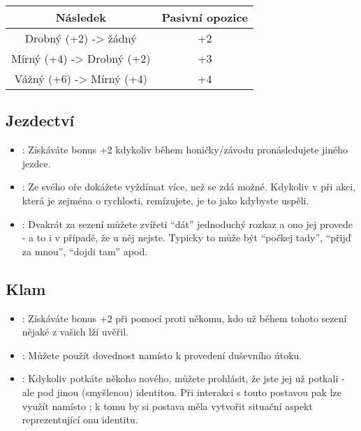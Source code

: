 \begin{table}[h]  
\centering
\begin{tabular}[h]{c|c}
Následek & Pasivní opozice \\ \hline
Drobný (+2) -> žádný & +2 \\
Mírný (+4) -> Drobný (+2) & +3 \\
Vážný (+6) -> Mírný (+4) & +4\\
\end{tabular}
\end{table}

\subsection{Jezdectví}
\label{sec:trik-jezd}
\begin{itemize}
  
\item{}:
\label{sec:jezdectvi-kliste}
Získáváte bonus +2 kdykoliv během honičky/závodu pronásledujete jiného jezdce.

\item{}:
\label{sec:jezdectvi-hyje}
Ze svého oře dokážete vyždímat více, než se zdá možné. Kdykoliv v při akci, která je zejména o rychlosti, remízujete, je to jako kdybyste uspěli.

\item{}:
\label{sec:jezdectvi-kamos}
Dvakrát za sezení můžete zvířeti ``dát'' jednoduchý rozkaz a ono jej provede - a to i v případě, že u něj nejste. Typicky to může být ``počkej tady'', ``přijď za mnou'', ``dojdi tam'' apod.

\end{itemize}

\subsection{Klam}
\label{sec:trik-klam}

\begin{itemize}
\item{}:
\label{sec:klam-lez}
Získáváte bonus +2 při  pomocí  proti někomu, kdo už během tohoto sezení nějaké z vašich lží uvěřil.

\item{}:
\label{sec:klam-mysl}
Můžete použít dovednost  namísto  k provedení duševního útoku.

\item{}:
\label{sec:klam-muz}
Kdykoliv potkáte někoho nového, můžete prohlásit, že jste jej už potkali - ale pod jinou (smyšlenou) identitou. Při interakci s touto postavou pak lze využít  namísto ; k tomu by si postava měla vytvořit situační aspekt reprezentující onu identitu.
\end{itemize}

